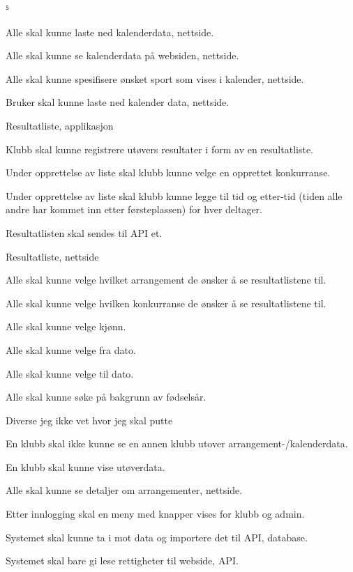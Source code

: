 ⁵\documentclass[norsk]{article}
\begin{document}
\begin{legal}
\begin{legal}
        \item Alle skal kunne laste ned kalenderdata, nettside.
        \item Alle skal kunne se kalenderdata på websiden, nettside.
        \item Alle skal kunne spesifisere ønsket sport som vises i kalender, nettside.
        \item Bruker skal kunne laste ned kalender data, nettside.
    \end{legal}
    \item Resultatliste, applikasjon
    \begin{legal}
        \item Klubb skal kunne registrere utøvers resultater i form av en resultatliste.
        \item Under opprettelse av liste skal klubb kunne velge en opprettet konkurranse.
        \item Under opprettelse av liste skal klubb kunne legge til tid og etter-tid (tiden alle andre har kommet inn etter førsteplassen) for hver deltager.
        \item Resultatlisten skal sendes til API et. 
    \end{legal}
    \item Resultatliste, nettside 
    \begin{legal}
        \item Alle skal kunne velge hvilket arrangement de ønsker å se resultatlistene til. 
        \item Alle skal kunne velge hvilken konkurranse de ønsker å se resultatlistene til.
        \item Alle skal kunne velge kjønn. 
        \item Alle skal kunne velge fra dato. 
        \item Alle skal kunne velge til dato.
        \item Alle skal kunne søke på bakgrunn av fødselsår. 
    \end{legal}
    \item Diverse jeg ikke vet hvor jeg skal putte
    \begin{legal}
        \item En klubb skal ikke kunne se en annen klubb utover arrangement-/kalenderdata.
        \item En klubb skal kunne vise utøverdata.
        \item Alle skal kunne se detaljer om arrangementer, nettside.
        \item Etter innlogging skal en meny med knapper vises for klubb og admin.
        \item Systemet skal kunne ta i mot data og importere det til API, database.
        \item Systemet skal bare gi lese rettigheter til webside, API.
    \end{legal}


\end{legal}
\end{document}
